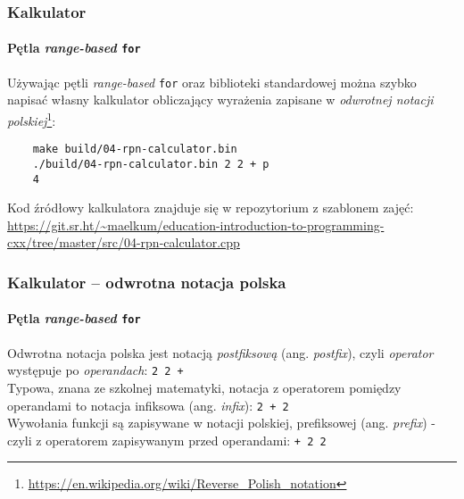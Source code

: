 \documentclass[aspectratio=169]{beamer}
\begin{document}
\begin{frame}[fragile]
    \frametitle{Kalkulator}
    \framesubtitle{Pętla \emph{range-based} {\tt for}}

    Używając pętli \emph{range-based} {\tt for} oraz biblioteki standardowej
    można szybko napisać własny kalkulator obliczający wyrażenia zapisane w
    \emph{odwrotnej notacji
    polskiej}\footnote{\url{https://en.wikipedia.org/wiki/Reverse_Polish_notation}}:

    \begin{lstlisting}
    make build/04-rpn-calculator.bin
    ./build/04-rpn-calculator.bin 2 2 + p
    4
    \end{lstlisting}

    {\tiny
    Kod źródłowy kalkulatora znajduje się w repozytorium z szablonem zajęć:
    \url{https://git.sr.ht/~maelkum/education-introduction-to-programming-cxx/tree/master/src/04-rpn-calculator.cpp}}
\end{frame}

\begin{frame}
    \frametitle{Kalkulator -- odwrotna notacja polska}
    \framesubtitle{Pętla \emph{range-based} {\tt for}}

    Odwrotna notacja polska jest notacją \emph{postfiksową} (ang.
    \emph{postfix}), czyli \emph{operator} występuje po \emph{operandach}:
    {\tt 2 2 +}\\
    Typowa, znana ze szkolnej matematyki, notacja z operatorem pomiędzy
    operandami to notacja infiksowa (ang. \emph{infix}): {\tt 2 + 2}\\
    Wywołania funkcji są zapisywane w notacji polskiej, prefiksowej (ang.
    \emph{prefix}) - czyli z operatorem zapisywanym przed operandami: {\tt + 2
    2}
\end{frame}
\end{document}
